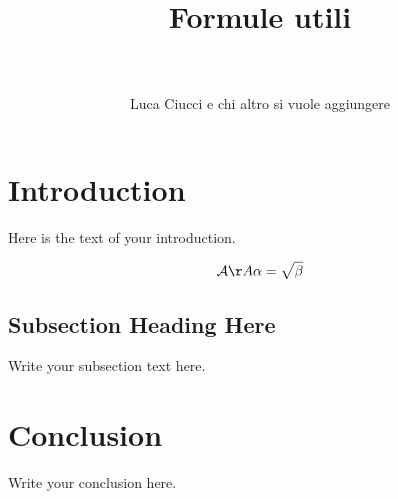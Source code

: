 \documentclass{scrbook}
\newcommand{\A}{\mathcal A}
\numberwithin{equation}{chapter}
\begin{document}
\title{Formule utili\\\mbox{}\\
}
\author{Luca Ciucci e chi altro si vuole aggiungere}
\maketitle%

\section{Introduction}
Here is the text of your introduction.

\begin{equation}
\A\AA
    \label{simple_equation}
    \alpha = \sqrt{ \beta }
\end{equation}

\subsection{Subsection Heading Here}
Write your subsection text here.


\section{Conclusion}
Write your conclusion here.


\end{document}
